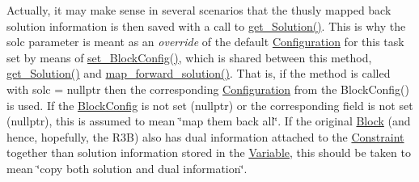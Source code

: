 Actually, it may make sense in several scenarios that the thusly mapped back solution information is then saved with a call to \mbox{\hyperlink{class_s_m_spp__di__unipi__it_1_1_block_a1db67c2f65111af4314e79dfc81ba597}{get\+\_\+\+Solution()}}. This is why the solc parameter is meant as an {\itshape override} of the default \mbox{\hyperlink{class_s_m_spp__di__unipi__it_1_1_configuration}{Configuration}} for this task set by means of \mbox{\hyperlink{class_s_m_spp__di__unipi__it_1_1_block_a18d411b740a47db00d15083c5c7ef2ba}{set\+\_\+\+Block\+Config()}}, which is shared between this method, \mbox{\hyperlink{class_s_m_spp__di__unipi__it_1_1_block_a1db67c2f65111af4314e79dfc81ba597}{get\+\_\+\+Solution()}} and \mbox{\hyperlink{class_s_m_spp__di__unipi__it_1_1_block_a7759467d70613a10c1cdb5d3193b4434}{map\+\_\+forward\+\_\+solution()}}. That is, if the method is called with solc = nullptr then the corresponding \mbox{\hyperlink{class_s_m_spp__di__unipi__it_1_1_configuration}{Configuration}} from the Block\+Config() is used. If the \mbox{\hyperlink{class_s_m_spp__di__unipi__it_1_1_block_config}{Block\+Config}} is not set (nullptr) or the corresponding field is not set (nullptr), this is assumed to mean \char`\"{}map them back all\char`\"{}. If the original \mbox{\hyperlink{class_s_m_spp__di__unipi__it_1_1_block}{Block}} (and hence, hopefully, the R3B) also has dual information attached to the \mbox{\hyperlink{class_s_m_spp__di__unipi__it_1_1_constraint}{Constraint}} together than solution information stored in the \mbox{\hyperlink{class_s_m_spp__di__unipi__it_1_1_variable}{Variable}}, this should be taken to mean \char`\"{}copy both solution and dual
information\char`\"{}.

